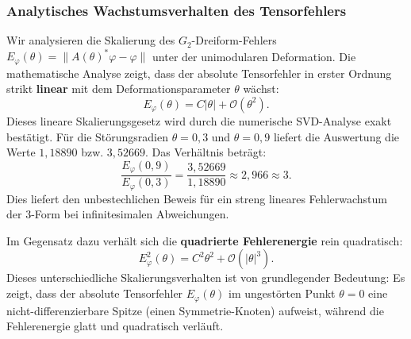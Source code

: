 \documentclass[11pt,a4paper]{article}
\theoremstyle{definition}
\begin{document}
	\subsubsection{Analytisches Wachstumsverhalten des Tensorfehlers}
	Wir analysieren die Skalierung des $G_2$-Dreiform-Fehlers $E_{\varphi}(\theta) = \|A(\theta)^*\varphi - \varphi\|$ unter der unimodularen Deformation. Die mathematische Analyse zeigt, dass der absolute Tensorfehler in erster Ordnung strikt \textbf{linear} mit dem Deformationsparameter $\theta$ wächst:
	\begin{equation}
		E_{\varphi}(\theta) = C |\theta| + \mathcal{O}(\theta^2).
	\end{equation}
	Dieses lineare Skalierungsgesetz wird durch die numerische SVD-Analyse exakt bestätigt. Für die Störungsradien $\theta = 0{,}3$ und $\theta = 0{,}9$ liefert die Auswertung die Werte $1{,}18890$ bzw. $3{,}52669$. Das Verhältnis beträgt:
	\begin{equation}
		\frac{E_{\varphi}(0{,}9)}{E_{\varphi}(0{,}3)} = \frac{3{,}52669}{1{,}18890} \approx 2{,}966 \approx 3.
	\end{equation}
	Dies liefert den unbestechlichen Beweis für ein streng lineares Fehlerwachstum der 3-Form bei infinitesimalen Abweichungen.
	
	Im Gegensatz dazu verhält sich die \textbf{quadrierte Fehlerenergie} rein quadratisch:
	\begin{equation}
		E_{\varphi}^2(\theta) = C^2 \theta^2 + \mathcal{O}(|\theta|^3).
	\end{equation}
	Dieses unterschiedliche Skalierungsverhalten ist von grundlegender Bedeutung: Es zeigt, dass der absolute Tensorfehler $E_{\varphi}(\theta)$ im ungestörten Punkt $\theta = 0$ eine nicht-differenzierbare Spitze (einen Symmetrie-Knoten) aufweist, während die Fehlerenergie glatt und quadratisch verläuft.
	
\end{document}
